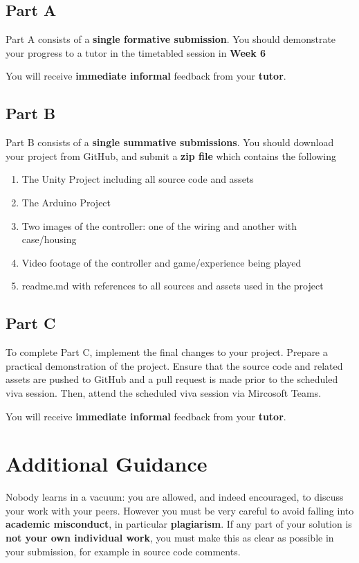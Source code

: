 \documentclass{../../fal_assignment}
\begin{document}
	\subsection*{Part A}
	
	Part A consists of a \textbf{single formative submission}. You should demonstrate your progress to a tutor in the timetabled session in \textbf{Week 6}
	
	You will receive \textbf{immediate informal} feedback from your \textbf{tutor}.
	
	\subsection*{Part B}
	
	Part B consists of a \textbf{single summative submissions}. You should download your project from GitHub, and submit a \textbf{zip file} which contains the following
	
	\begin{enumerate}
		\item The Unity Project including all source code and assets
		\item The Arduino Project
		\item Two images of the controller: one of the wiring and another with case/housing
		\item Video footage of the controller and game/experience being played
		\item readme.md with references to all sources and assets used in the project
	\end{enumerate}
	
	
	\subsection*{Part C}
	To complete Part C, implement the final changes to your project. Prepare a practical demonstration of the project. Ensure that the source code and related assets are pushed to GitHub and a pull request is made prior to the scheduled viva session. Then, attend the scheduled viva session via Mircosoft Teams. 
	
	You will receive \textbf{immediate informal} feedback from your \textbf{tutor}.
	
	\section*{Additional Guidance}

	Nobody learns in a vacuum: you are allowed, and indeed encouraged, to discuss your work with your peers. 
	However you must be very careful to avoid falling into \textbf{academic misconduct}, 
	in particular \textbf{plagiarism}. If any part of your solution is \textbf{not your own individual work}, you must make this as clear as possible in your submission, for example in source code comments.
	
\end{document}
